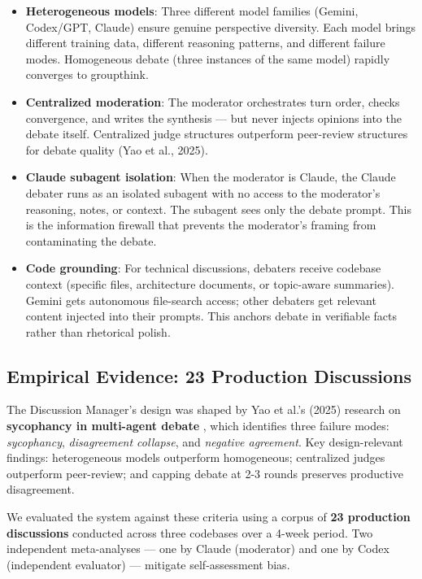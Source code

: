 \documentclass[11pt,a4paper]{article}
\begin{document}
\begin{itemize}
\item
  \textbf{Heterogeneous models}: Three different model families (Gemini, Codex/GPT, Claude) ensure genuine perspective diversity. Each model brings different training data, different reasoning patterns, and different failure modes. Homogeneous debate (three instances of the same model) rapidly converges to groupthink.
\item
  \textbf{Centralized moderation}: The moderator orchestrates turn order, checks convergence, and writes the synthesis --- but never injects opinions into the debate itself. Centralized judge structures outperform peer-review structures for debate quality (Yao et al., 2025).
\item
  \textbf{Claude subagent isolation}: When the moderator is Claude, the Claude debater runs as an isolated subagent with no access to the moderator's reasoning, notes, or context. The subagent sees only the debate prompt. This is the information firewall that prevents the moderator's framing from contaminating the debate.
\item
  \textbf{Code grounding}: For technical discussions, debaters receive codebase context (specific files, architecture documents, or topic-aware summaries). Gemini gets autonomous file-search access; other debaters get relevant content injected into their prompts. This anchors debate in verifiable facts rather than rhetorical polish.
\end{itemize}

\subsection{Empirical Evidence: 23 Production Discussions}\label{sec:empirical-evidence-production-discussions}

The Discussion Manager's design was shaped by Yao et al.'s (2025) research on \textbf{sycophancy in multi-agent debate} \cite{yao2025}, which identifies three failure modes: \emph{sycophancy}, \emph{disagreement collapse}, and \emph{negative agreement}. Key design-relevant findings: heterogeneous models outperform homogeneous; centralized judges outperform peer-review; and capping debate at 2-3 rounds preserves productive disagreement.

We evaluated the system against these criteria using a corpus of \textbf{23 production discussions} conducted across three codebases over a 4-week period. Two independent meta-analyses --- one by Claude (moderator) and one by Codex (independent evaluator) --- mitigate self-assessment bias.
\end{document}
